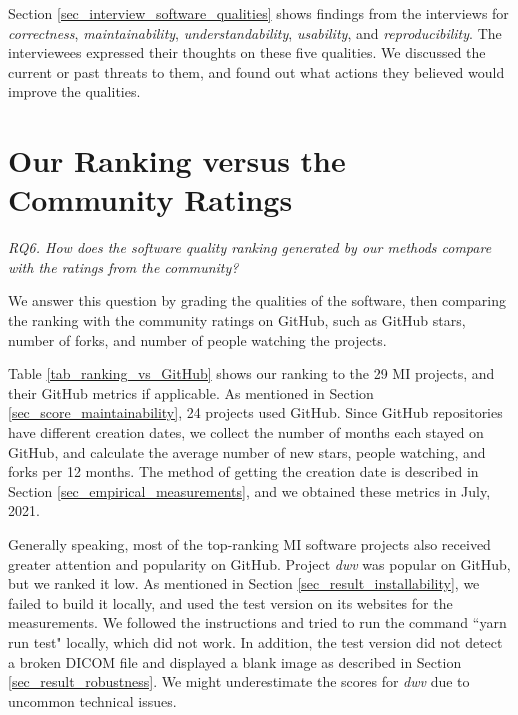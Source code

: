 Section \ref{sec_interview_software_qualities} shows findings from the interviews for \textit{correctness}, \textit{maintainability}, \textit{understandability}, \textit{usability}, and \textit{reproducibility}. The interviewees expressed their thoughts on these five qualities. We discussed the current or past threats to them, and found out what actions they believed would improve the qualities.

\section{Our Ranking versus the Community Ratings}
\label{sec_rq6_comparison}
\textit{RQ6. How does the software quality ranking generated by our methods compare with the ratings from the community?}

We answer this question by grading the qualities of the software, then comparing the ranking with the community ratings on GitHub, such as GitHub stars, number of forks, and number of people watching the projects.

Table \ref{tab_ranking_vs_GitHub} shows our ranking to the 29 MI projects, and their GitHub metrics if applicable. As mentioned in Section \ref{sec_score_maintainability}, 24 projects used GitHub. Since GitHub repositories have different creation dates, we collect the number of months each stayed on GitHub, and calculate the average number of new stars, people watching, and forks per 12 months. The method of getting the creation date is described in Section \ref{sec_empirical_measurements}, and we obtained these metrics in July, 2021.

Generally speaking, most of the top-ranking MI software projects also received greater attention and popularity on GitHub. Project \textit{dwv} was popular on GitHub, but we ranked it low. As mentioned in Section \ref{sec_result_installability}, we failed to build it locally, and used the test version on its websites for the measurements. We followed the instructions and tried to run the command ``yarn run test" locally, which did not work. In addition, the test version did not detect a broken DICOM file and displayed a blank image as described in Section \ref{sec_result_robustness}. We might underestimate the scores for \textit{dwv} due to uncommon technical issues.

